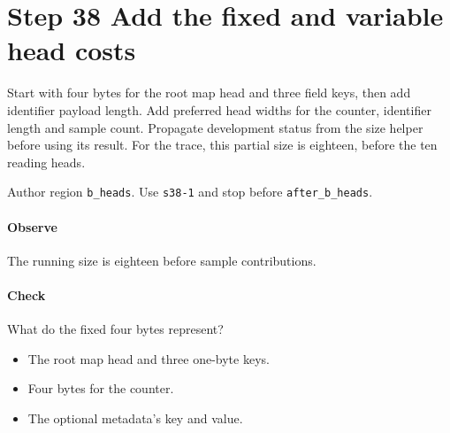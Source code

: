 \section{Step 38 Add the fixed and variable head costs}\label{cbor-s38}
Start with four bytes for the root map head and three field keys, then add identifier payload length. Add preferred head widths for the counter, identifier length and sample count. Propagate development status from the size helper before using its result. For the trace, this partial size is eighteen, before the ten reading heads.

Author region \texttt{b\_heads}. Use \texttt{s38-1} and stop before \texttt{after\_b\_heads}.

\paragraph{Observe} The running size is eighteen before sample contributions.

\paragraph{Check} What do the fixed four bytes represent?
\begin{itemize}
\item[A.] The root map head and three one-byte keys.
\item[B.] Four bytes for the counter.
\item[C.] The optional metadata's key and value.
\end{itemize}

